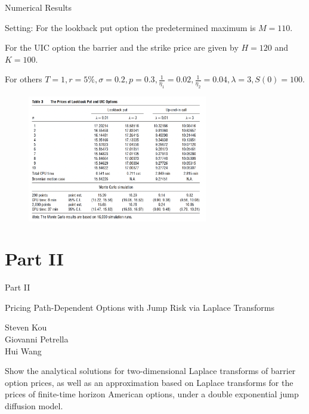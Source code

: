 \documentclass{beamer}
\begin{document}
\begin{frame}{Numerical Results}

    {\footnotesize \footnotesize
    
    \par Setting: For the lookback put option the predetermined maximum is $M = 110$. 
    \par For the UIC option the barrier and the strike price are given by $H = 120$ and $K = 100$. 
    \par For others \( T = 1 ,  r = 5\% ,\sigma = 0.2,  p = 0.3,  \frac{1}{\eta_1} = 0.02,  \frac{1}{\eta_2}  = 0.04, \lambda = 3, S(0) = 100\).
    }
    \begin{figure}
    \centering
    \includegraphics[width=0.7\textwidth]{1}
    \end{figure}
    
\end{frame}

\section{Part II}
\begin{frame}{Part II}

    \begin{center}
        Pricing Path-Dependent Options with Jump Risk via Laplace Transforms
    \end{center}
    \vspace{2em}
    \begin{center}
        Steven Kou\\
        Giovanni Petrella\\
        Hui Wang
    \end{center}
    \vspace{3em}
    \par  Show the analytical solutions for two-dimensional Laplace transforms of barrier option prices,
     as well as an approximation based on Laplace transforms for the prices of finite-time horizon American options, under a double exponential jump diffusion model.
    
\end{frame}



    
\end{document}
